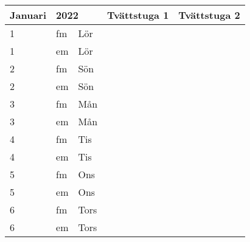 \documentclass[a4paper]{article}
\begin{document}
\begin{table}[ht!]
\vspace{-10em}%
\normalsize
\begin{tabular}{lllp{7cm}p{7cm}}
\textbf{Januari}           & \multicolumn{2}{l}{\textbf{2022}}                  & \textbf{Tvättstuga 1} & \textbf{Tvättstuga 2} \\ \hline    

\multicolumn{1}{|l|}{1} & \multicolumn{1}{l|}{fm} & \multicolumn{1}{l|}{Lör} & \multicolumn{1}{l|}{} & \multicolumn{1}{l|}{} \\ \hline
\multicolumn{1}{|l|}{1} & \multicolumn{1}{l|}{em} & \multicolumn{1}{l|}{Lör} & \multicolumn{1}{l|}{} & \multicolumn{1}{l|}{} \\ \hline    

\multicolumn{1}{|l|}{2} & \multicolumn{1}{l|}{fm} & \multicolumn{1}{l|}{Sön} & \multicolumn{1}{l|}{} & \multicolumn{1}{l|}{} \\ \hline
\multicolumn{1}{|l|}{2} & \multicolumn{1}{l|}{em} & \multicolumn{1}{l|}{Sön} & \multicolumn{1}{l|}{} & \multicolumn{1}{l|}{} \\ \hline    

\multicolumn{1}{|l|}{3} & \multicolumn{1}{l|}{fm} & \multicolumn{1}{l|}{Mån} & \multicolumn{1}{l|}{} & \multicolumn{1}{l|}{} \\ \hline
\multicolumn{1}{|l|}{3} & \multicolumn{1}{l|}{em} & \multicolumn{1}{l|}{Mån} & \multicolumn{1}{l|}{} & \multicolumn{1}{l|}{} \\ \hline    

\multicolumn{1}{|l|}{4} & \multicolumn{1}{l|}{fm} & \multicolumn{1}{l|}{Tis} & \multicolumn{1}{l|}{} & \multicolumn{1}{l|}{} \\ \hline
\multicolumn{1}{|l|}{4} & \multicolumn{1}{l|}{em} & \multicolumn{1}{l|}{Tis} & \multicolumn{1}{l|}{} & \multicolumn{1}{l|}{} \\ \hline    

\multicolumn{1}{|l|}{5} & \multicolumn{1}{l|}{fm} & \multicolumn{1}{l|}{Ons} & \multicolumn{1}{l|}{} & \multicolumn{1}{l|}{} \\ \hline
\multicolumn{1}{|l|}{5} & \multicolumn{1}{l|}{em} & \multicolumn{1}{l|}{Ons} & \multicolumn{1}{l|}{} & \multicolumn{1}{l|}{} \\ \hline    

\multicolumn{1}{|l|}{6} & \multicolumn{1}{l|}{fm} & \multicolumn{1}{l|}{Tors} & \multicolumn{1}{l|}{} & \multicolumn{1}{l|}{} \\ \hline
\multicolumn{1}{|l|}{6} & \multicolumn{1}{l|}{em} & \multicolumn{1}{l|}{Tors} & \multicolumn{1}{l|}{} & \multicolumn{1}{l|}{} \\ \hline    


\end{tabular}
\end{table}
\end{document}
